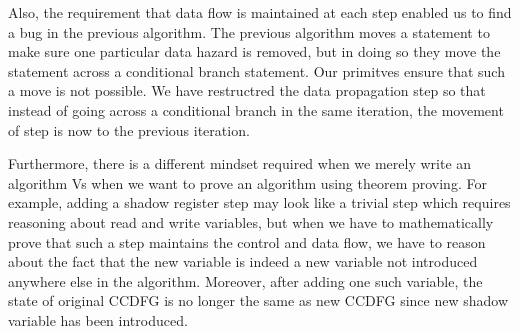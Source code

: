 Also, the requirement that data flow is maintained at each step enabled us to find a bug in the previous algorithm. The previous algorithm moves a statement to make sure one particular data hazard is removed, but in doing so they move the statement across a conditional branch statement. Our primitves ensure that such a move is not possible. We have restructred the data propagation step so that instead of going across a conditional branch in the same iteration, the movement of step is now to the previous iteration. 

Furthermore, there is a different mindset required when we merely write an algorithm Vs when we want to prove an algorithm using theorem proving. For example, adding a shadow register step may look like a trivial step which requires reasoning about read and write variables, but when we have to mathematically prove that such a step maintains the control and data flow, we have to reason about the fact that the new variable is indeed a new variable not introduced anywhere else in the algorithm. Moreover, after adding one such variable, the state of original CCDFG is no longer the same as new CCDFG since new shadow variable has been introduced. 


